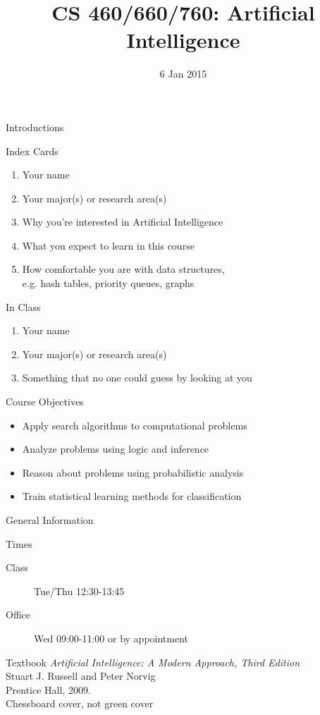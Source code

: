 \documentclass[14pt]{beamer}
\title{CS 460/660/760: Artificial Intelligence}
\date[]{6 Jan 2015}
\begin{document}
\begin{frame}
  \titlepage
\end{frame}

\begin{frame}{Introductions}
	\begin{block}{Index Cards}
		\begin{enumerate}
			\item Your name
			\item Your major(s) or research area(s)
			\item Why you're interested in Artificial Intelligence
			\item What you expect to learn in this course
			\item How comfortable you are with data structures, \\
			      e.g. hash tables, priority queues, graphs
		\end{enumerate}
	\end{block}
	\pause
	\begin{block}{In Class}
		\begin{enumerate}
			\item Your name
			\item Your major(s) or research area(s)
			\item Something that no one could guess by looking at you
		\end{enumerate}
	\end{block}
\end{frame}

\begin{frame}{Course Objectives}
	\begin{itemize}
		\item Apply search algorithms to computational problems
		\item Analyze problems using logic and inference
		\item Reason about problems using probabilistic analysis
		\item Train statistical learning methods for classification
	\end{itemize}
\end{frame}

\begin{frame}{General Information}
	\begin{block}{Times}
		\begin{description}
			\item[Class] Tue/Thu 12:30-13:45
			\item[Office] Wed 09:00-11:00 or by appointment
		\end{description}
	\end{block}
	\begin{block}{Textbook}
		\textit{Artificial Intelligence: A Modern Approach, Third Edition}\\		
		Stuart J. Russell and Peter Norvig\\
		Prentice Hall, 2009.\\
		\hfill \alert{Chessboard cover, not green cover}
	\end{block}
\end{frame}
\end{document}
